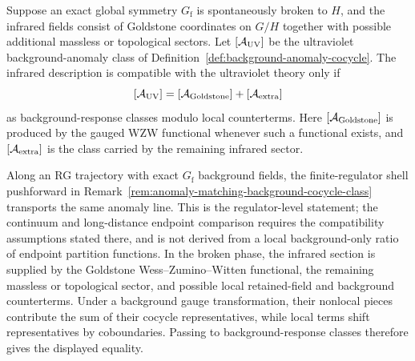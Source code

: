 \begin{remark}
\label{rem:anomaly-matching-across-ssb}
Suppose an exact global symmetry \(G_{\mathrm f}\) is spontaneously broken to
\(H\), and the infrared fields consist of Goldstone coordinates on \(G/H\)
together with possible additional massless or topological sectors.  Let
\([\mathcal A_{\rm UV}]\) be the ultraviolet background-anomaly class of
Definition~\ref{def:background-anomaly-cocycle}.  The infrared description is
compatible with the ultraviolet theory only if
\[
  [\mathcal A_{\rm UV}]
  =
  [\mathcal A_{\rm Goldstone}]
  +
  [\mathcal A_{\rm extra}]
\]
as background-response classes modulo local counterterms.  Here
\([\mathcal A_{\rm Goldstone}]\) is produced by the gauged WZW functional
whenever such a functional exists, and \([\mathcal A_{\rm extra}]\) is the
class carried by the remaining infrared sector.

Along an RG trajectory with exact \(G_{\mathrm f}\) background fields, the
finite-regulator shell pushforward in
Remark~\ref{rem:anomaly-matching-background-cocycle-class} transports the same
anomaly line.  This is the regulator-level statement; the continuum and
long-distance endpoint comparison requires the compatibility assumptions
stated there, and is not derived from a local background-only ratio of endpoint
partition functions.  In the broken phase, the infrared section is supplied by
the Goldstone Wess--Zumino--Witten functional, the remaining massless or
topological sector, and possible local retained-field and background
counterterms.  Under a background gauge transformation, their nonlocal pieces
contribute the sum of their cocycle representatives, while local terms shift
representatives by coboundaries.  Passing to background-response classes
therefore gives the displayed equality.
\end{remark}

